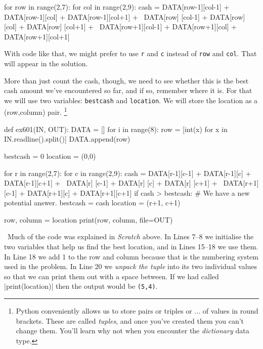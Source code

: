 \begin{pythoncode}
  for row in range(2,7):
    for col in range(2,9):
      cash = DATA[row-1][col-1] + DATA[row-1][col] + DATA[row-1][col+1] + \
             DATA[row]  [col-1] + DATA[row]  [col] + DATA[row]  [col+1] + \
             DATA[row+1][col-1] + DATA[row+1][col] + DATA[row+1][col+1]
\end{pythoncode}

With code like that, we might prefer to use \texttt{r} and \texttt{c} instead of
\texttt{row} and \texttt{col}. That will appear in the solution.

More than just count the cash, though, we need to see whether this is the best cash amount
we've encountered so far, and if so, remember where it is. For that we will use two
variables: \texttt{bestcash} and \texttt{location}. We will store the location as a
(row,column) pair.%
\footnote{Python conveniently allows us to store pairs or triples or ... of values in
round brackets. These are called \emph{tuples}, and once you've created them you can't
change them. You'll learn why not when you encounter the \emph{dictionary} data type.}

\Solution

\begin{pythoncode}
  def ex601(IN, OUT):
    DATA = []
    for i in range(8):
      row = [int(x) for x in IN.readline().split()]
      DATA.append(row)
    
    bestcash = 0
    location = (0,0)

    for r in range(2,7):
      for c in range(2,9):
        cash = DATA[r-1][c-1] + DATA[r-1][c] + DATA[r-1][c+1] + \
               DATA[r]  [c-1] + DATA[r]  [c] + DATA[r]  [c+1] + \
               DATA[r+1][c-1] + DATA[r+1][c] + DATA[r+1][c+1]
        if cash > bestcash:
          # We have a new potential answer.
          bestcash = cash
          location = (r+1, c+1)

    row, column = location
    print(row, column, file=OUT)
\end{pythoncode}

\Explanation\ Much of the code was explained in \emph{Scratch} above. In Lines 7--8 we
initialise the two variables that help us find the best location, and in Lines 15--18 we
use them. In Line 18 we add 1 to the row and column because that is the numbering system
used in the problem. In Line 20 we \emph{unpack the tuple} into its two individual values
so that we can print them out with a space between. If we had called
\pycode|print(location)| then the output would be \texttt{(5,4)}.


